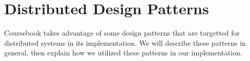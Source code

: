 \chapter{Distributed Design Patterns}

Coursebook takes advantage of some design patterns that are targetted for
distributed systems in its implementation. We will describe these patterns in
general, then explain how we utilized these patterns in our implementation.


